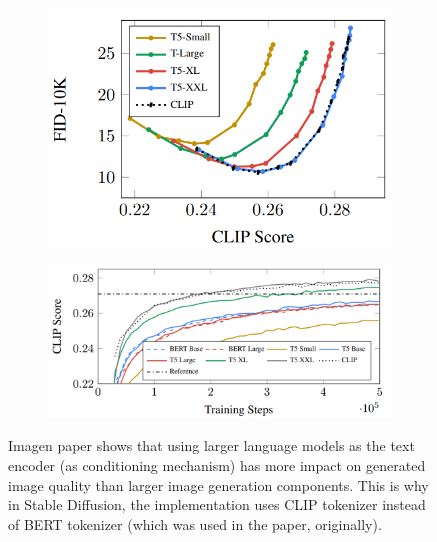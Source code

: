 \begin{figure}[h]
    \centering
    \begin{subfigure}[b]{0.4\textwidth}
        \centering
        \includegraphics[width=1\textwidth]{images/diffusion_models/stable_diffusion/imagen_clip_score_bigger_llm_encoder.png}
    \end{subfigure}
    \hfill
    \begin{subfigure}[b]{0.7\textwidth}
        \centering
        \includegraphics[width=1\textwidth]{images/diffusion_models/stable_diffusion/imagen_clip_score_bigger_llm_encoder2.png}
    \end{subfigure}
    \caption{Imagen paper \cite{imagen} shows that using larger language models as the text encoder (as conditioning mechanism) has more impact on generated image quality than larger image generation components. This is why in Stable Diffusion, the implementation uses CLIP tokenizer instead of BERT tokenizer (which was used in the paper, originally).}
    \label{fig:imagen_clip_score_bigger_llm}
\end{figure}

